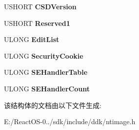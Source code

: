 \begin{DoxyCompactItemize}
\item 
\mbox{\label{struct_i_m_a_g_e___l_o_a_d___c_o_n_f_i_g___d_i_r_e_c_t_o_r_y32_a5bc0ab3999ac3726e364cbe1662d49f6}} 
U\+S\+H\+O\+RT {\bfseries C\+S\+D\+Version}
\item 
\mbox{\label{struct_i_m_a_g_e___l_o_a_d___c_o_n_f_i_g___d_i_r_e_c_t_o_r_y32_a7772595af4d9bf743cfacae601fe0e70}} 
U\+S\+H\+O\+RT {\bfseries Reserved1}
\item 
\mbox{\label{struct_i_m_a_g_e___l_o_a_d___c_o_n_f_i_g___d_i_r_e_c_t_o_r_y32_a314ab2d43ef126f58aeb8fdcfc58e2b0}} 
U\+L\+O\+NG {\bfseries Edit\+List}
\item 
\mbox{\label{struct_i_m_a_g_e___l_o_a_d___c_o_n_f_i_g___d_i_r_e_c_t_o_r_y32_af063ee8a271fc031771c4cc66df1548d}} 
U\+L\+O\+NG {\bfseries Security\+Cookie}
\item 
\mbox{\label{struct_i_m_a_g_e___l_o_a_d___c_o_n_f_i_g___d_i_r_e_c_t_o_r_y32_a324a34ad9573a5fec97d2d9ec6c4c9ab}} 
U\+L\+O\+NG {\bfseries S\+E\+Handler\+Table}
\item 
\mbox{\label{struct_i_m_a_g_e___l_o_a_d___c_o_n_f_i_g___d_i_r_e_c_t_o_r_y32_aa00a15c9b2a6708befba057b7725d8d0}} 
U\+L\+O\+NG {\bfseries S\+E\+Handler\+Count}
\end{DoxyCompactItemize}


该结构体的文档由以下文件生成\+:\begin{DoxyCompactItemize}
\item 
E\+:/\+React\+O\+S-\/0../sdk/include/ddk/ntimage.\+h\end{DoxyCompactItemize}
